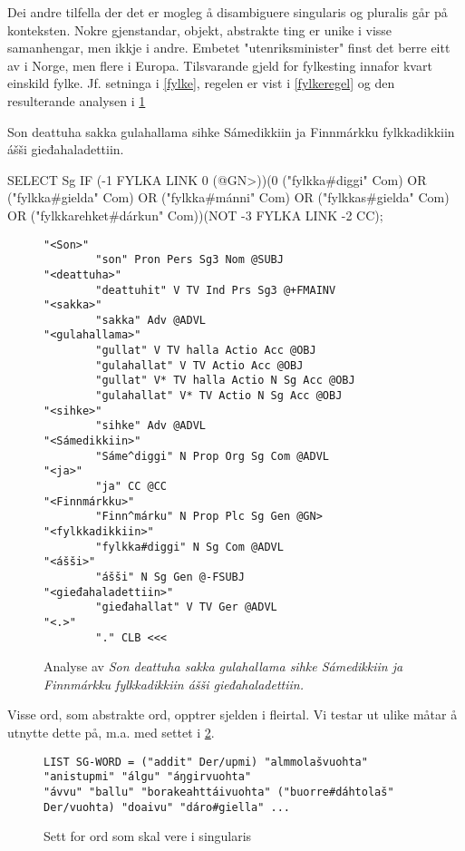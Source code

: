 \documentclass[a4paper,norsk]{article}
\begin{document}
Dei andre tilfella der det er mogleg å disambiguere singularis og pluralis går på konteksten. Nokre gjenstandar, objekt, abstrakte ting er unike i visse samanhengar, men ikkje i andre. Embetet "utenriksminister" finst det berre eitt av i Norge, men flere i Europa. Tilsvarande gjeld for fylkesting innafor kvart einskild fylke. Jf. setninga i \ref{fylke}, regelen er vist i \ref{fylkeregel} og den resulterande analysen i \ref{fylkeanalyse} %

\begin{example}\label{fylke}
Son deattuha sakka gulahallama sihke Sámedikkiin ja Finnmárkku fylkkadikkiin ášši gieđahaladettiin.
\end{example}

\begin{example}\label{fylkeregel}
SELECT Sg IF (-1 FYLKA LINK 0 (@GN>))(0 ("fylkka\#diggi" Com) OR ("fylkka\#gielda" Com) OR ("fylkka\#mánni" Com) OR ("fylkkas\#gielda" Com) OR ("fylkkarehket\#dárkun" Com))(NOT -3 FYLKA LINK -2 CC);
\end{example}

\begin{figure}[htbp]
\begin{center}
\begin{verbatim}
"<Son>"
        "son" Pron Pers Sg3 Nom @SUBJ
"<deattuha>"
        "deattuhit" V TV Ind Prs Sg3 @+FMAINV
"<sakka>"
        "sakka" Adv @ADVL
"<gulahallama>"
        "gullat" V TV halla Actio Acc @OBJ
        "gulahallat" V TV Actio Acc @OBJ
        "gullat" V* TV halla Actio N Sg Acc @OBJ
        "gulahallat" V* TV Actio N Sg Acc @OBJ
"<sihke>"
        "sihke" Adv @ADVL
"<Sámedikkiin>"
        "Sáme^diggi" N Prop Org Sg Com @ADVL
"<ja>"
        "ja" CC @CC
"<Finnmárkku>"
        "Finn^márku" N Prop Plc Sg Gen @GN>
"<fylkkadikkiin>"
        "fylkka#diggi" N Sg Com @ADVL
"<ášši>"
        "ášši" N Sg Gen @-FSUBJ
"<gieđahaladettiin>"
        "gieđahallat" V TV Ger @ADVL
"<.>"
        "." CLB <<<
\end{verbatim}

\caption{Analyse av \emph{Son deattuha sakka gulahallama sihke Sámedikkiin ja Finnmárkku fylkkadikkiin ášši gieđahaladettiin.}}
\label{fylkeanalyse}
\end{center}
\end{figure}

Visse ord, som abstrakte ord, opptrer sjelden i fleirtal. Vi testar ut ulike måtar å utnytte dette på, m.a. med settet i \ref{sgwds}. %


\begin{figure}[htbp]
\begin{center}
\begin{verbatim}
LIST SG-WORD = ("addit" Der/upmi) "almmolašvuohta" "anistupmi" "álgu" "áŋgirvuohta" 
"ávvu" "ballu" "borakeahttáivuohta" ("buorre#dáhtolaš" Der/vuohta) "doaivu" "dáro#giella" ...
\end{verbatim}
\caption{Sett for ord som skal vere i singularis}
\label{sgwds}
\end{center}
\end{figure}
\end{document}
